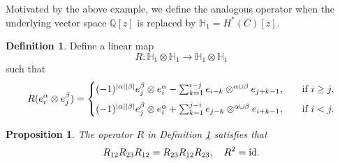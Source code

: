 \documentclass[10pt]{amsart}
\newcommand{\BQ}{\mathbb{Q}}
\newcommand{\BH}{\mathbb{H}}
\newcommand{\id}{\textnormal{id}}
\newcommand{\+}{{}^+}
\newtheorem {proposition}[theorem]{Proposition}
\theoremstyle{definition}
\theoremstyle {definition}
\theoremstyle {definition}
\newtheorem{definition}[theorem]{Definition}
\def\verticaldistance{6pt}
\begin{document}
Motivated by the above example, we define the analogous operator when the underlying vector space $\BQ[z]$ is replaced by $\BH_1=H^*(C)[z]$. 

\begin{definition}\label{def: curve YB operator}
Define a linear map
\[R:  \mathbb{H}_1 \otimes \mathbb{H}_1 \rightarrow  \mathbb{H}_1\otimes \mathbb{H}_1\] 
such that
$$
R(e^{\alpha}_i \otimes e^{\beta}_j)=
\begin{cases}
(-1)^{|\alpha||\beta|} e^{\beta}_j \otimes e^{\alpha}_i - \sum_{k=1}^{i-j} e_{i-k} \otimes^{\alpha \cup \beta} e_{j+k-1},&\quad\textnormal{if}\ i\geq j, \\[\verticaldistance]
 (-1)^{|\alpha||\beta|} e^{\beta}_j \otimes e^{\alpha}_i + \sum_{k=1}^{j-i} e_{j-k} \otimes^{\alpha \cup \beta} e_{i+k-1},&\quad\textnormal{if}\ i<j.\\
\end{cases}
$$
\end{definition}

\begin{proposition} \label{prop:twist}
The operator $R$ in Definition \ref{def: curve YB operator}
satisfies that
$$R_{12}R_{23}R_{12}=R_{23}R_{12}R_{23},\quad R^2=\id.
$$
\end{proposition}
\end{document}

